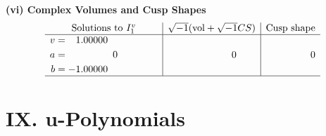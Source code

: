 \documentclass[1p]{elsarticle_modified}
\theoremstyle{definition}
\newcommand{\I}{\sqrt{-1}}
\begin{document}
\newpage\flushleft \textbf{(vi) Complex Volumes and Cusp Shapes}
$$\begin{array}{c|c|c}  
\text{Solutions to }I^v_{1}& \I (\text{vol} + \sqrt{-1}CS) & \text{Cusp shape}\\
 \hline 
\begin{aligned}
v &= \phantom{-}1.00000\phantom{ +0.000000I} \\
a &= \phantom{-0.000000 } 0 \\
b &= -1.00000\phantom{ +0.000000I}\end{aligned}
 & \phantom{-0.000000 } 0 & \phantom{-0.000000 } 0\\
 \hline 
 \end{array}$$\newpage
\newpage\renewcommand{\arraystretch}{1}
\centering \section*{ IX. u-Polynomials}
\end{document}
